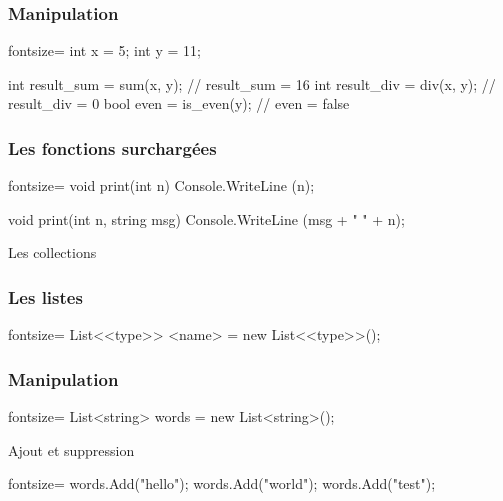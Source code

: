 \begin{frame}[fragile]
  \frametitle{Manipulation}

  \begin{csharpcode*}{fontsize=\scriptsize}
    int x = 5;
    int y = 11;

    int result_sum = sum(x, y); // result_sum = 16
    int result_div = div(x, y); // result_div = 0
    bool even = is_even(y); // even = false
  \end{csharpcode*}
\end{frame}

\begin{frame}[fragile]
  \frametitle{Les fonctions surchargées}

  \begin{csharpcode*}{fontsize=\scriptsize}
    void print(int n)
    {
      Console.WriteLine (n);
    }

    void print(int n, string msg)
    {
      Console.WriteLine (msg + " " + n);
    }
  \end{csharpcode*}
\end{frame}

\begin{frame}
  \begin{center}
    \vspace{1cm}
    Les collections
  \end{center}
\end{frame}

\begin{frame}[fragile]
  \frametitle{Les listes}

  \begin{csharpcode*}{fontsize=\scriptsize}
    List<<type>> <name> = new List<<type>>();
  \end{csharpcode*}
\end{frame}

\begin{frame}[fragile]
  \frametitle{Manipulation}

  \begin{csharpcode*}{fontsize=\scriptsize}
    List<string> words = new List<string>();
  \end{csharpcode*}

  \pause

  \begin{center}{\large Ajout et suppression}\end{center}
  \begin{csharpcode*}{fontsize=\scriptsize}
    words.Add("hello");
    words.Add("world");
    words.Add("test");
  \end{csharpcode*}
\end{frame}

